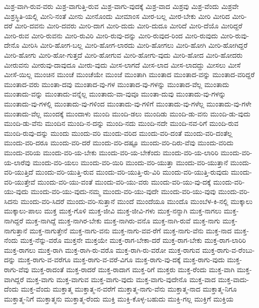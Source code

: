 {ಮಿಶ್ರ-ವಾಗಿ-ರುವ-ವರು
ಮಿಶ್ರ-ವಾಗುತ್ತಿ-ರುವ
ಮಿಶ್ರ-ವಾಗು-ವುದಕ್ಕೆ
ಮಿಶ್ರ-ವಾದ
ಮಿಶ್ರವು
ಮಿಶ್ರ-ವೆಂದು
ಮಿಶ್ರವೇ
ಮಿಶ್ರಸ್ಥಿತಿ-ಯಲ್ಲಿ
ಮೀನಿ-ನಂತೆ
ಮೀನು
ಮೀನೊಂದು
ಮೀಮಾಂಸ
ಮೀರ-ಬಲ್ಲ
ಮೀರ-ಬೇಕು
ಮೀರಿ
ಮೀರಿದ
ಮೀರಿ-ದರೆ
ಮೀರಿ-ದವನು
ಮೀರಿ-ದವರು
ಮೀರಿ-ದಾಗ
ಮೀರಿ-ದುದು
ಮೀರಿ-ದುದೂ
ಮೀರಿದೆ
ಮೀರಿ-ದೆಯೊ
ಮೀರಿದ್ದರೆ
ಮೀರಿ-ರುವ
ಮೀರಿ-ರುವನು
ಮೀರಿ-ರುವಿರಿ
ಮೀರಿ-ರುವು-ದನ್ನು
ಮೀರಿ-ರುವುದ-ರಿಂದ
ಮೀರಿ-ರುವುದು
ಮೀರಿ-ರುವು-ದೇನೊ
ಮೀರಿಸಿ
ಮೀರಿ-ಹೋಗ-ಬಲ್ಲ
ಮೀರಿ-ಹೋಗ-ಲಾರದು
ಮೀರಿ-ಹೋಗಲು
ಮೀರಿ-ಹೋಗಿ
ಮೀರಿ-ಹೋಗಿದ್ದರೆ
ಮೀರಿ-ಹೋಗು
ಮೀರಿ-ಹೋ-ಗುತ್ತದೆ
ಮೀರಿ-ಹೋಗುವ
ಮೀರಿ-ಹೋಗು-ವುದು
ಮೀರಿ-ಹೋದ
ಮೀರಿ-ಹೋದರು
ಮೀರುವನು
ಮೀರುವು-ದಾವುದೂ
ಮೀರು-ವುದು
ಮೀಸ-ಲಾಗದೆ
ಮೀಸ-ಲಾದ
ಮೀಸ-ಲಾದದ್ದು
ಮೀಸಲು
ಮೀಸೆ
ಮೀಸೆ-ಯಿಲ್ಲ
ಮುಂಚಿನ
ಮುಂಚೆ
ಮುಂಚೆಯೇ
ಮುಂಜೆ
ಮುಂತಾಗಿ
ಮುಂತಾದ
ಮುಂತಾದ-ವನ್ನು
ಮುಂತಾದ-ವರಿದ್ದರೆ
ಮುಂತಾದ-ವರು
ಮುಂತಾ-ದವು
ಮುಂತಾದ-ವು-ಗಳ
ಮುಂತಾದ-ವು-ಗಳನ್ನು
ಮುಂತಾದ-ವೆಲ್ಲ
ಮುಂತಾದು
ಮುಂತಾದು-ವನ್ನು
ಮುಂತಾದು-ವನ್ನೆಲ್ಲ
ಮುಂತಾದು-ವಾ-ವುವೂ
ಮುಂತಾ-ದುವು
ಮುಂತಾದು-ವು-ಗಳನ್ನು
ಮುಂತಾದು-ವು-ಗಳಲ್ಲಿ
ಮುಂತಾದು-ವು-ಗಳಿಂದ
ಮುಂತಾದು-ವು-ಗಳಿಗೆ
ಮುಂತಾದು-ವು-ಗಳೆಲ್ಲ
ಮುಂತಾದು-ವು-ಗಳೇ
ಮುಂತಾದು-ವೆಲ್ಲ
ಮುಂದಕ್ಕೆ
ಮುಂದಾಳು
ಮುಂದಿ
ಮುಂದಿ-ಡಲು
ಮುಂದಿಡು
ಮುಂದಿ-ಡು-ವನು
ಮುಂದಿ-ಡು-ವುದು
ಮುಂದಿ-ಡು-ವೆನು
ಮುಂದಿನ
ಮುಂದಿ-ನ-ದನ್ನು
ಮುಂದಿ-ನದು
ಮುಂದಿ-ನದೇ
ಮುಂದಿ-ನವ-ರಿಗೆ
ಮುಂದಿ-ರುವ
ಮುಂದಿ-ರುವು-ದನ್ನು
ಮುಂದು
ಮುಂದು-ವರಿ
ಮುಂದು-ವರಿದ
ಮುಂದು-ವರಿ-ದಂತೆ
ಮುಂದು-ವರಿ-ದಂತೆಲ್ಲ
ಮುಂದು-ವರಿ-ದರೂ
ಮುಂದು-ವರಿ-ದರೆ
ಮುಂದು-ವರಿ-ದಷ್ಟೂ
ಮುಂದು-ವರಿ-ದಿರು-ವೆವು
ಮುಂದು-ವರಿದು
ಮುಂದು-ವರಿಯ
ಮುಂದು-ವರಿ-ಯ-ಬೇಕು
ಮುಂದು-ವರಿ-ಯ-ಬೇಕೆಂದು
ಮುಂದು-ವರಿ-ಯ-ಲಾರಿರಿ
ಮುಂದು-ವರಿ-ಯ-ಲಾರೆವು
ಮುಂದು-ವರಿ-ಯಲು
ಮುಂದು-ವರಿ-ಯಿರಿ
ಮುಂದು-ವರಿ-ಯುತ್ತಾ
ಮುಂದು-ವರಿ-ಯುತ್ತಾನೆ
ಮುಂದು-ವರಿ-ಯುತ್ತಿದೆ
ಮುಂದು-ವರಿ-ಯುತ್ತಿ-ರುವ
ಮುಂದು-ವರಿ-ಯುತ್ತಿ-ರು-ವಿರಿ
ಮುಂದು-ವರಿ-ಯುತ್ತಿ-ರುವುದು
ಮುಂದು-ವರಿ-ಯುತ್ತೇವೆ
ಮುಂದು-ವರಿ-ಯು-ವಂತೆ
ಮುಂದು-ವರಿ-ಯು-ವರು
ಮುಂದು-ವರಿ-ಯು-ವು-ದಕ್ಕೆ
ಮುಂದು-ವರಿ-ಯು-ವುದು
ಮುಂದು-ವರಿ-ಯು-ವುದು-ನಮ್ಮ
ಮುಂದು-ವರಿ-ಯು-ವುದೇ
ಮುಂದು-ವರಿ-ಯು-ವುವು
ಮುಂದು-ವರಿ-ಸಿದನು
ಮುಂದು-ವರಿ-ಸಿದರೆ
ಮುಂದು-ವರಿ-ಸುತ್ತಾನೆ
ಮುಂದೆ
ಮುಂದೆಯೂ
ಮುಂದೊ
ಮುಂಬೆಳ-ಕಿ-ನಲ್ಲಿ
ಮುಕ್ಕಾಲು
ಮುಕ್ಕಾಲು-ಪಾಲು
ಮುಕ್ತ
ಮುಕ್ತ-ಗೊಳಿ
ಮುಕ್ತ-ಜೀವಿ
ಮುಕ್ತ-ಜೀವಿ-ಗಳು
ಮುಕ್ತ-ನನ್ನಾಗಿ
ಮುಕ್ತ-ನಾಗಲು
ಮುಕ್ತ-ನಾಗಿದ್ದರೆ
ಮುಕ್ತ-ನಾಗಿದ್ದೆ
ಮುಕ್ತ-ನಾಗಿರ-ಬೇಕು
ಮುಕ್ತ-ನಾಗಿರು-ವನೊ
ಮುಕ್ತ-ನಾಗಿ-ರುವೆ
ಮುಕ್ತ-ನಾಗು
ಮುಕ್ತ-ನಾಗುತ್ತಾನೆ
ಮುಕ್ತ-ನಾಗುತ್ತೇನೆ
ಮುಕ್ತ-ನಾಗು-ವನು
ಮುಕ್ತ-ನಾಗು-ವವ-ರೆಗೆ
ಮುಕ್ತ-ನಾಗು-ವೆನು
ಮುಕ್ತ-ನಾದ
ಮುಕ್ತ-ನೆಂದು
ಮುಕ್ತ-ನೆನ್ನು-ವರೊ
ಮುಕ್ತನೇ
ಮುಕ್ತಯೇ
ಮುಕ್ತ-ರಾಗ-ಬೇಕಾ-ದರೆ
ಮುಕ್ತ-ರಾಗ-ಬೇಕು
ಮುಕ್ತ-ರಾಗ-ಲಾರಿರಿ
ಮುಕ್ತ-ರಾಗಲು
ಮುಕ್ತ-ರಾಗಿ
ಮುಕ್ತ-ರಾಗಿ-ರು-ವರೊ
ಮುಕ್ತ-ರಾಗಿ-ರು-ವರೋ
ಮುಕ್ತ-ರಾಗುವ
ಮುಕ್ತ-ರಾಗು-ವ-ರೆಂಬು-ದನ್ನು
ಮುಕ್ತ-ರಾಗು-ವ-ವರೆಗೂ
ಮುಕ್ತ-ರಾಗು-ವ-ವರೆ-ವಿಗೂ
ಮುಕ್ತ-ರಾಗು-ವು-ದಕ್ಕೆ
ಮುಕ್ತ-ರಾಗು-ವುದು
ಮುಕ್ತ-ರಾಗು-ವೆವು
ಮುಕ್ತ-ರಾದಂತೆ
ಮುಕ್ತ-ರಾದರೆ
ಮುಕ್ತ-ರಾದಾಗ
ಮುಕ್ತ-ರಿಗೆ
ಮುಕ್ತರು
ಮುಕ್ತ-ರೆಂದು
ಮುಕ್ತ-ವಾಗಿ
ಮುಕ್ತ-ವಾಗಿದ್ದರೆ
ಮುಕ್ತ-ವಾಗು
ಮುಕ್ತ-ವಾಗುವ
ಮುಕ್ತ-ವಾಗು-ವುದು
ಮುಕ್ತ-ವಾಗು-ವುದೇನೊ
ಮುಕ್ತ-ವಾದ
ಮುಕ್ತ-ವಾದು-ದೆಂದು
ಮುಕ್ತ-ವೆಂದು
ಮುಕ್ತಾತ್ಮ
ಮುಕ್ತಾತ್ಮ-ನ-ವರೆಗೆ
ಮುಕ್ತಾತ್ಮ-ನಾಗು-ವೆನು
ಮುಕ್ತಾತ್ಮ-ನಾದ
ಮುಕ್ತಾತ್ಮ-ನಿಗೂ
ಮುಕ್ತಾತ್ಮ-ನಿಗೆ
ಮುಕ್ತಾತ್ಮನು
ಮುಕ್ತಾತ್ಮ-ರೆಂದು
ಮುಕ್ತಿ
ಮುಕ್ತಿ-ಕೊಳ್ಳ-ಬಹುದು
ಮುಕ್ತಿ-ಗಲ್ಲ
ಮುಕ್ತಿಗೆ
ಮುಕ್ತಿಯ
}

